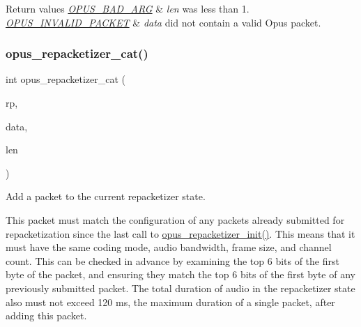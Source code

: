 \begin{DoxyRetVals}{Return values}
{\em \hyperlink{group__opus__errorcodes_gaf2d43e479455a1a3b6874e5faf4e827d}{O\+P\+U\+S\+\_\+\+B\+A\+D\+\_\+\+A\+RG}} & {\itshape len} was less than 1. \\
\hline
{\em \hyperlink{group__opus__errorcodes_ga46fc9dd493fb8e291bd8e838f0988bb7}{O\+P\+U\+S\+\_\+\+I\+N\+V\+A\+L\+I\+D\+\_\+\+P\+A\+C\+K\+ET}} & {\itshape data} did not contain a valid Opus packet. \\
\hline
\end{DoxyRetVals}
\mbox{\label{group__opus__repacketizer_ga2840dd56bfa37f8c6874355b9ce8fb46}} 
\subsubsection{\texorpdfstring{opus\+\_\+repacketizer\+\_\+cat()}{opus\_repacketizer\_cat()}}
{\footnotesize\ttfamily int opus\+\_\+repacketizer\+\_\+cat (\begin{DoxyParamCaption}\item[{\hyperlink{group__opus__repacketizer_ga1f85070a64bcbf5bf24f5ccb80323e7b}{Opus\+Repacketizer} $\ast$}]{rp,  }\item[{const unsigned char $\ast$}]{data,  }\item[{\hyperlink{opus__types_8h_aa4d309d6f80b99dbabebc8f98879ab9a}{opus\+\_\+int32}}]{len }\end{DoxyParamCaption})}



Add a packet to the current repacketizer state. 

This packet must match the configuration of any packets already submitted for repacketization since the last call to \hyperlink{group__opus__repacketizer_gab42ff7c3f8a49ff5029fcf60f3b853f0}{opus\+\_\+repacketizer\+\_\+init()}. This means that it must have the same coding mode, audio bandwidth, frame size, and channel count. This can be checked in advance by examining the top 6 bits of the first byte of the packet, and ensuring they match the top 6 bits of the first byte of any previously submitted packet. The total duration of audio in the repacketizer state also must not exceed 120 ms, the maximum duration of a single packet, after adding this packet.

